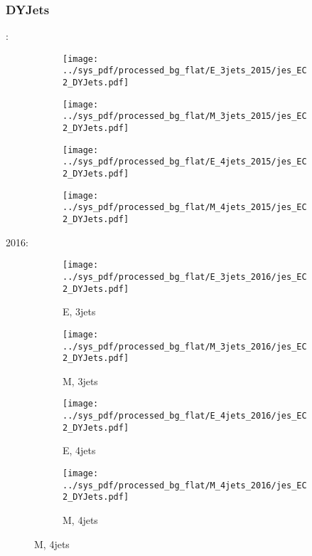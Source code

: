 \documentclass{beamer}
\begin{document}
\begin{frame}
\frametitle{DYJets}
\fontsize{5}{1}:
\begin{figure}
\centering
\begin{subfigure}[b]{0.24\textwidth}
\texttt{[image: ../sys\_pdf/processed\_bg\_flat/E\_3jets\_2015/jes\_EC2\_DYJets.pdf]}
\end{subfigure}
\begin{subfigure}[b]{0.24\textwidth}
\texttt{[image: ../sys\_pdf/processed\_bg\_flat/M\_3jets\_2015/jes\_EC2\_DYJets.pdf]}
\end{subfigure}
\begin{subfigure}[b]{0.24\textwidth}
\texttt{[image: ../sys\_pdf/processed\_bg\_flat/E\_4jets\_2015/jes\_EC2\_DYJets.pdf]}
\end{subfigure}
\begin{subfigure}[b]{0.24\textwidth}
\texttt{[image: ../sys\_pdf/processed\_bg\_flat/M\_4jets\_2015/jes\_EC2\_DYJets.pdf]}
\end{subfigure}
\end{figure}
2016:
\begin{figure}
\centering
\begin{subfigure}[b]{0.24\textwidth}
\texttt{[image: ../sys\_pdf/processed\_bg\_flat/E\_3jets\_2016/jes\_EC2\_DYJets.pdf]}
\captionsetup{font=tiny}
\caption{E, 3jets}
\end{subfigure}
\begin{subfigure}[b]{0.24\textwidth}
\texttt{[image: ../sys\_pdf/processed\_bg\_flat/M\_3jets\_2016/jes\_EC2\_DYJets.pdf]}
\captionsetup{font=tiny}
\caption{M, 3jets}
\end{subfigure}
\begin{subfigure}[b]{0.24\textwidth}
\texttt{[image: ../sys\_pdf/processed\_bg\_flat/E\_4jets\_2016/jes\_EC2\_DYJets.pdf]}
\captionsetup{font=tiny}
\caption{E, 4jets}
\end{subfigure}
\begin{subfigure}[b]{0.24\textwidth}
\texttt{[image: ../sys\_pdf/processed\_bg\_flat/M\_4jets\_2016/jes\_EC2\_DYJets.pdf]}
\captionsetup{font=tiny}
\caption{M, 4jets}
\end{subfigure}
\end{figure}
\end{frame}
\end{document}
